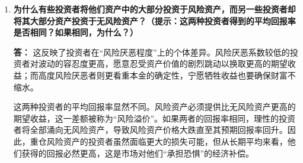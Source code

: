 \begin{enumerate}[label=\textbf{\arabic*.}, leftmargin=*]
		\item \textbf{为什么有些投资者将他们资产中的大部分投资于风险资产，而另一些投资者却将其大部分资产投资于无风险资产？（提示：这两种投资者得到的平均回报率是否相同？如果相同，为什么？）}
		
		\textbf{答：}
		这反映了投资者在“风险厌恶程度”上的个体差异。风险厌恶系数较低的投资者对波动的容忍度更高，愿意忍受资产价值的剧烈跳动以换取更高的期望收益；而高度风险厌恶者则更看重本金的确定性，宁愿牺牲收益也要确保财富不缩水。
		
		这两种投资者的平均回报率显然不同。风险资产必须提供比无风险资产更高的期望收益，这一差额被称为“风险溢价”。如果两者的回报率相同，理性的投资者将全部涌向无风险资产，导致风险资产价格大跌直至其预期回报率回升。因此，重仓风险资产的投资者虽然面临更大的损失可能，但从长期平均来看，他们获得的回报必然更高，这是市场对他们“承担恐惧”的经济补偿。
		
	\end{enumerate}
	
	\newpage
